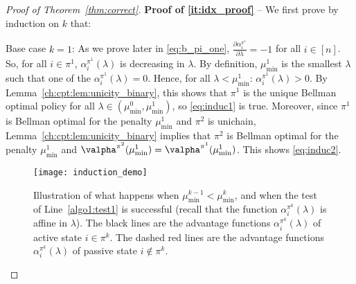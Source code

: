 \begin{proof}[Proof of Theorem~\ref{thm:correct}]
    \textbf{Proof of \ref{it:idx_proof}} -- We first prove by induction on $k$ that:\\

    Base case $k=1$: As we prove later in \eqref{eq:b_pi_one}, $\frac{\partial \alpha^{\pi^1}_i}{\partial \lambda} =-1$ for all $i\in[n]$.
    So, for all $i\in\pi^1$, $\alpha^{\pi^1}_i(\lambda)$ is decreasing in $\lambda$.
    By definition, $\mu^1_{\min}$ is the smallest $\lambda$ such that one of the $\alpha^{\pi^{1}}_i(\lambda) = 0$.
    Hence, for all $\lambda<\mu^1_{\min}$: $\alpha^{\pi^{1}}_i(\lambda)>0$.
    By Lemma~\ref{ch:cpt:lem:unicity_binary}, this shows that $\pi^1$ is the unique Bellman optimal policy for all $\lambda\in (\mu^0_{\min}, \mu^1_{\min})$, so \ref{eq:induc1} is true.
    Moreover, since $\pi^1$ is Bellman optimal for the penalty $\mu^1_{\min}$ and $\pi^2$ is unichain, Lemma~\ref{ch:cpt:lem:unicity_binary} implies that $\pi^{2}$ is Bellman optimal for the penalty $\mu^{1}_{\min}$ and $\valpha^{\pi^2}(\mu^1_{\min}) =\valpha^{\pi^1}(\mu^1_{\min})$.
    This shows \ref{eq:induc2}.
    \begin{figure}[ht]
        \centering
            \texttt{[image: induction\_demo]}
        \caption{Illustration of what happens when $\mu^{k-1}_{\min}<\mu^k_{\min}$, and when the test of Line~\ref{algo1:test1} is successful (recall that the function $\alpha^{\pi^{k}}_i(\lambda)$ is affine in $\lambda$). The black lines are the advantage functions $\alpha^{\pi^k}_i(\lambda)$ of active state $i\in\pi^k$. The dashed red lines are the advantage functions $\alpha^{\pi^k}_i(\lambda)$ of passive state $i\not\in\pi^k$.}
        \label{fig:proof_algo}
    \end{figure}


\end{proof}

